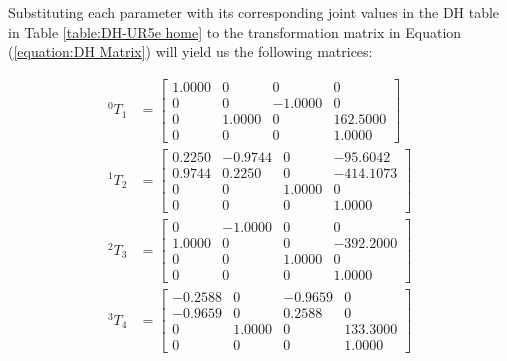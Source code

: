 Substituting each parameter with its corresponding joint values in the DH table in Table \ref{table:DH-UR5e home} to the transformation matrix in Equation (\ref{equation:DH Matrix}) will yield us the following matrices:

\begin{equation*}
    \begin{split}
        ^{0}T_{1} & = \begin{bmatrix}
                          1.0000 & 0      & 0       & 0        \\
                          0      & 0      & -1.0000 & 0        \\
                          0      & 1.0000 & 0       & 162.5000 \\
                          0      & 0      & 0       & 1.0000
                      \end{bmatrix}  \\
        ^{1}T_{2} & = \begin{bmatrix}
                          0.2250 & -0.9744 & 0      & -95.6042  \\
                          0.9744 & 0.2250  & 0      & -414.1073 \\
                          0      & 0       & 1.0000 & 0         \\
                          0      & 0       & 0      & 1.0000
                      \end{bmatrix} \\
        ^{2}T_{3} & = \begin{bmatrix}
                          0      & -1.0000 & 0      & 0         \\
                          1.0000 & 0       & 0      & -392.2000 \\
                          0      & 0       & 1.0000 & 0         \\
                          0      & 0       & 0      & 1.0000
                      \end{bmatrix} \\
        ^{3}T_{4} & = \begin{bmatrix}
                          -0.2588 & 0      & -0.9659 & 0        \\
                          -0.9659 & 0      & 0.2588  & 0        \\
                          0       & 1.0000 & 0       & 133.3000 \\
                          0       & 0      & 0       & 1.0000
                      \end{bmatrix} \\

\end{split}
\end{equation*}
